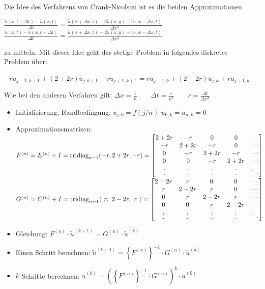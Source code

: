 Die Idee des Verfahrens von Crank-Nicolson ist es die beiden Approximationen

$\boxed{\frac{\tilde{u}(x,t+\Delta t) - \tilde{u}(x,t)}{\Delta t} = 
\frac{\tilde{u}(x+\Delta x, t)-2\tilde{u}(x,y) + \tilde{u}( x - \Delta x, t )} {\Delta x^2}}$
$\boxed{\frac{\tilde{u}(x,t) - \tilde{u}(x,t -\Delta t)}{\Delta t} = 
\frac{\tilde{u}(x+\Delta x, t)-2\tilde{u}(x,y) + \tilde{u}( x - \Delta x, t )} {\Delta x^2}}$

zu mitteln. Mit dieser Idee geht das stetige Problem in folgendes diskretes Problem über:

$-r \tilde{u}_{j-1,k+1} + (2+2r)\tilde{u}_{j,k+1} - r \tilde{u}_{j+1,k+1} = r
\tilde{u}_{j-1,k} + (2-2r)\tilde{u}_{j,k} + r \tilde{u}_{j+1,k} $

Wie bei den anderen Verfahren gilt: $\Delta x=\frac{1}{n} \qquad \Delta t=\frac{r}{n^2} \qquad \boxed{r=\frac{\Delta
t}{\Delta x^2}}$
\begin{itemize}
\item Initialisierung, Randbedingung: $\tilde{u}_{j,0}=f(j/n)$ \qquad $\tilde{u}_{0,k}=\tilde{u}_{n,k}=0$
\item Approximationsmatrizen:\\
$F^{(n)}=E^{(n)}+I=\operatorname{tridiag}_{n-1}(-r,2+2r,-r)=\begin{bmatrix}
2+2r& -r	& 0		& 0 	&\cdots\\
-r	& 2+2r  & -r	& 0		&\cdots\\
0	& -r	& 2+2r 	& -r 	&\cdots\\
0	& 0		& -r	& 2+2r 	&\cdots\\
\vdots&	\vdots&\vdots&\vdots&\ddots	
\end{bmatrix}$\\
$G^{(n)}=C^{(n)}+I=\operatorname{tridiag}_{n-1}(~r,~2-2r,~r~)=\begin{bmatrix}
2-2r& r		& 0		& 0 	&\cdots\\
r	& 2-2r  & r		& 0		&\cdots\\
0	& r		& 2-2r 	& r 	&\cdots\\
0	& 0		& r		& 2-2r 	&\cdots\\
\vdots&	\vdots&\vdots&\vdots&\ddots	
\end{bmatrix}$
\item Gleichung: $F^{(n)} \cdot \tilde{u}^{(k+1)}=G^{(n)} \cdot \tilde{u}^{(k)}$
\item Einen Schritt berechnen: $\tilde{u}^{(k+1)}=\left\{F^{(n)}\right\}^{-1} \cdot G^{(n)}\cdot \tilde{u}^{(k)}$
\item $k$-Schritte berechnen: $\tilde{u}^{(k)}=\left(\left\{F^{(n)}\right\}^{-1} \cdot G^{(n)}\right)^{k}\cdot \tilde{u}^{(0)}$
\end{itemize}

